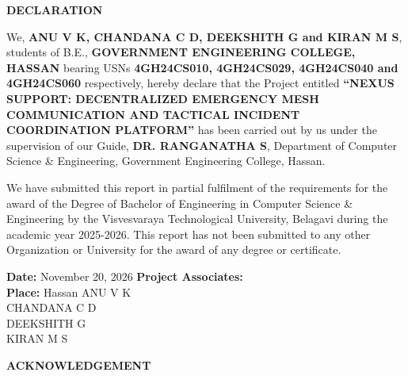 \documentclass[12pt,a4paper]{report}
\begin{document}
\thispagestyle{empty}
\begin{center}
  \textbf{\Large DECLARATION}\\[1.0cm]
\end{center}

{\sloppy\setlength{\parindent}{1.5em}
We, \textbf{ANU V K, CHANDANA C D, DEEKSHITH G and KIRAN M S}, students of B.E., \textbf{GOVERNMENT ENGINEERING COLLEGE, HASSAN} bearing USNs \textbf{4GH24CS010, 4GH24CS029, 4GH24CS040 and 4GH24CS060} respectively, hereby declare that the Project entitled \textbf{``NEXUS SUPPORT: DECENTRALIZED EMERGENCY MESH COMMUNICATION AND TACTICAL INCIDENT COORDINATION PLATFORM''} has been carried out by us under the supervision of our Guide, \textbf{DR. RANGANATHA S}, Department of Computer Science & Engineering, Government Engineering College, Hassan.\par}

\vspace{0.4cm}
{\setlength{\parindent}{1.5em}
We have submitted this report in partial fulfilment of the requirements for the award of the Degree of Bachelor of Engineering in Computer Science & Engineering by the Visvesvaraya Technological University, Belagavi during the academic year 2025-2026. This report has not been submitted to any other Organization or University for the award of any degree or certificate.\par}

\vspace{1.2cm}
\noindent
\textbf{Date:} November 20, 2026 \hfill \textbf{Project Associates:}\\[0.2cm]
\textbf{Place:} Hassan \hfill ANU V K\\
\null \hfill CHANDANA C D\\
\null \hfill DEEKSHITH G\\
\null \hfill KIRAN M S
\newpage

\hypersetup{pageanchor=true}
\setcounter{page}{1}

\begin{center}
  \textbf{\Large ACKNOWLEDGEMENT}\\[0.6cm]
\end{center}
\end{document}
